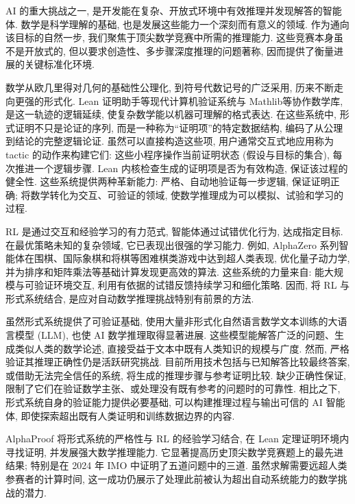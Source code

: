 \label{alphaproof-main}
AI 的重大挑战之一, 是开发能在复杂、开放式环境中有效推理并发现解答的智能体. 数学是科学理解的基础, 也是发展这些能力一个深刻而有意义的领域. 作为通向该目标的自然一步, 我们聚焦于顶尖数学竞赛中所需的推理能力. 这些竞赛本身虽不是开放式的, 但以要求创造性、多步骤深度推理的问题著称, 因而提供了衡量进展的关键标准化环境.

数学从欧几里得对几何的基础性公理化, 到符号代数记号的广泛采用, 历来不断走向更强的形式化. Lean 证明助手\cite{alphaproof-ref1}等现代计算机验证系统与 Mathlib\cite{alphaproof-ref4}等协作数学库, 是这一轨迹的逻辑延续, 使复杂数学能以机器可理解的格式表达. 在这些系统中, 形式证明不只是论证的序列, 而是一种称为“证明项”的特定数据结构, 编码了从公理到结论的完整逻辑论证. 虽然可以直接构造这些项, 用户通常交互式地应用称为 tactic 的动作来构建它们: 这些小程序操作当前证明状态 (假设与目标的集合), 每次推进一个逻辑步骤. Lean 内核检查生成的证明项是否为有效构造, 保证该过程的健全性. 这些系统提供两种革新能力: 严格、自动地验证每一步逻辑, 保证证明正确; 将数学转化为交互、可验证的领域, 使数学推理成为可以模拟、试验和学习的过程.

RL 是通过交互和经验学习的有力范式, 智能体通过试错优化行为, 达成指定目标. 在最优策略未知的复杂领域, 它已表现出很强的学习能力. 例如, AlphaZero 系列智能体在围棋、国际象棋和将棋\cite{alphaproof-ref2}等困难棋类游戏中达到超人类表现, 优化量子动力学\cite{alphaproof-ref5}, 并为排序\cite{alphaproof-ref6}和矩阵乘法\cite{alphaproof-ref7}等基础计算发现更高效的算法. 这些系统的力量来自: 能大规模与可验证环境交互, 利用有依据的试错反馈持续学习和细化策略. 因而, 将 RL 与形式系统结合, 是应对自动数学推理挑战特别有前景的方法.

虽然形式系统提供了可验证基础, 使用大量非形式化自然语言数学文本训练的大语言模型 (LLM), 也使 AI 数学推理取得显著进展. 这些模型能解答广泛的问题、生成类似人类的数学论述\cite{alphaproof-ref8,alphaproof-ref9,alphaproof-ref10}, 直接受益于文本中既有人类知识的规模与广度. 然而, 严格验证其推理正确性仍是活跃研究挑战. 目前所用技术包括与已知解答比较最终答案, 或借助无法完全信任的系统, 将生成的推理步骤与参考证明比较\cite{alphaproof-ref11,alphaproof-ref12}. 缺少正确性保证, 限制了它们在验证数学主张、或处理没有既有参考的问题时的可靠性. 相比之下, 形式系统自身的验证能力提供必要基础, 可以构建推理过程与输出可信的 AI 智能体, 即使探索超出既有人类证明和训练数据边界的内容.

AlphaProof 将形式系统的严格性与 RL 的经验学习结合, 在 Lean 定理证明环境内寻找证明, 并发展强大数学推理能力. 它显著提高历史顶尖数学竞赛题上的最先进结果; 特别是在 2024 年 IMO 中证明了五道问题中的三道. 虽然求解需要远超人类参赛者的计算时间, 这一成功仍展示了处理此前被认为超出自动系统能力的数学挑战的潜力.

